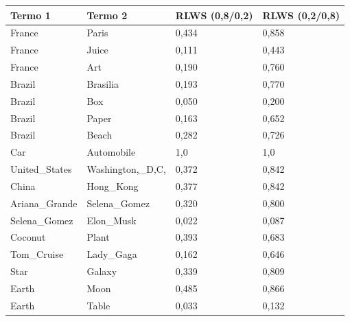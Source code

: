 \begin{table}[H]
\centering
\begin{tabular}{|l|l|l|l|}
\hline
\textbf{Termo 1} & \textbf{Termo 2}    & \textbf{RLWS (0,8/0,2)} & \textbf{RLWS (0,2/0,8)} \\ \hline
France           & Paris               & 0,434                   & 0,858                   \\ \hline
France           & Juice               & 0,111                   & 0,443                   \\ \hline
France           & Art                 & 0,190                   & 0,760                   \\ \hline
Brazil           & Brasilia            & 0,193                   & 0,770                   \\ \hline
Brazil           & Box                 & 0,050                   & 0,200                   \\ \hline
Brazil           & Paper               & 0,163                   & 0,652                   \\ \hline
Brazil           & Beach               & 0,282                   & 0,726                   \\ \hline
Car              & Automobile          & 1,0                     & 1,0                     \\ \hline
United\_States   & Washington,\_D,C,   & 0,372                   & 0,842                   \\ \hline
China            & Hong\_Kong          & 0,377                   & 0,842                   \\ \hline
Ariana\_Grande   & Selena\_Gomez       & 0,320                   & 0,800                   \\ \hline
Selena\_Gomez    & Elon\_Musk          & 0,022                   & 0,087                   \\ \hline
Coconut          & Plant               & 0,393                   & 0,683                   \\ \hline
Tom\_Cruise      & Lady\_Gaga          & 0,162                   & 0,646                   \\ \hline
Star             & Galaxy              & 0,339                   & 0,809                   \\ \hline
Earth            & Moon                & 0,485                   & 0,866                   \\ \hline
Earth            & Table               & 0,033                   & 0,132                   \\ \hline

\end{tabular}
\end{table}
